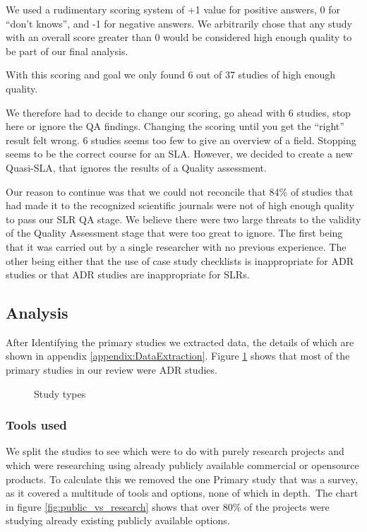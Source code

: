 We used a rudimentary scoring system of +1 value for positive answers, 0 for ``don't knows'', and -1 for negative answers.
We arbitrarily chose that any study with an overall score greater than 0 would be considered high enough quality to be part of our final analysis.

With this scoring and goal we only found 6 out of 37 studies of high enough quality.

We therefore had to decide to change our scoring, go ahead with 6 studies, stop here or ignore the QA findings.
Changing the scoring until you get the ``right'' result felt wrong.
6 studies seems too few to give an overview of a field.
Stopping seems to be the correct course for an SLA.
However, we decided to create a new Quasi-SLA, that ignores the results of a Quality assessment.

Our reason to continue was that we could not reconcile that 84\% of studies that had made it to the recognized scientific journals were not of high enough quality to pass our SLR QA stage.
We believe there were two large threats to the validity of the Quality Assessment stage that were too great to ignore.
The first being that it was carried out by a single researcher with no previous experience.
The other being either that the use of case study checklists is inappropriate for ADR studies or that ADR studies are inappropriate for SLRs.


\subsection{Analysis}
After Identifying the primary studies we extracted data, the details of which are shown in appendix \ref{appendix:DataExtraction}.
Figure \ref{fig:study_types} shows that most of the primary studies in our review were ADR studies.

\begin{figure}[h]
    \centering
    \caption{Study types}
    \label{fig:study_types}
\end{figure}

\subsubsection{Tools used}
We split the studies to see which were to do with purely research projects and which were researching using already publicly available commercial or opensource products.
To calculate this we removed the one Primary study that was a survey, as it covered a multitude of tools and options, none of which in depth.\
The chart in figure \ref{fig:public_vs_research} shows that over 80\% of the projects were studying already existing publicly available options.


